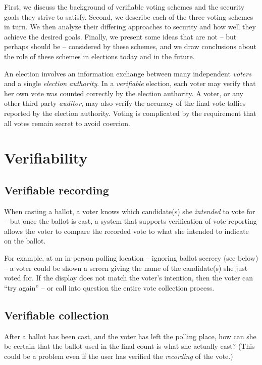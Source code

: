 \documentclass[10pt,twocolumn]{article}
\newcommand{\term}[1]{\textit{#1}}
\begin{document}
First, we discuss the background of verifiable voting schemes and the security goals they
strive to satisfy. Second, we describe each of the three voting schemes in turn. We then
analyze their differing approaches to security and how well they achieve the desired goals. Finally,
we present some ideas that are not -- but perhaps should be -- considered by these schemes, and
we draw conclusions about the role of these schemes in elections today and in the future.

An election involves an information exchange between many independent \term{voters} and a single
\term{election authority}.
In a \term{verifiable} election, each voter may verify that her own vote was counted correctly
by the election authority.
A voter, or any other third party \term{auditor}, may also verify the accuracy of the final vote tallies
reported by the election authority. \cite{preta}
Voting is complicated by the requirement that all votes remain secret to avoid coercion.

\section{Verifiability}

\subsection{Verifiable recording}

When casting a ballot, a voter knows which candidate(s) she \emph{intended} to vote for -- but
once the ballot is cast, a system that supports verification of vote reporting allows the voter to
compare the recorded vote to what she intended to indicate on the ballot.

For example, at an in-person polling location -- ignoring ballot secrecy (see below) -- a voter
could be shown a screen giving the name of the candidate(s) she just voted for. If the display
does not match the voter's intention, then the voter can ``try again'' -- or call into question the
entire vote collection process.

\subsection{Verifiable collection}

After a ballot has been cast, and the voter has left the polling place, how can she be certain
that the ballot used in the final count is what she actually cast? (This could be a problem even
if the user has verified the \emph{recording} of the vote.)
\end{document}

